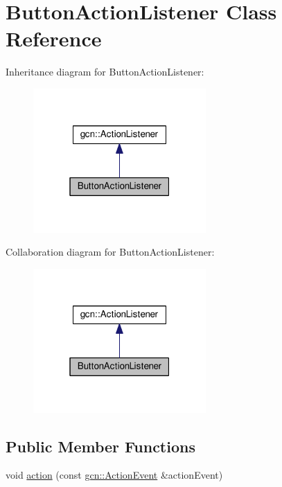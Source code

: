 \hypertarget{classButtonActionListener}{}\section{Button\+Action\+Listener Class Reference}
\label{classButtonActionListener}


Inheritance diagram for Button\+Action\+Listener\+:\nopagebreak
\begin{figure}[H]
\begin{center}
\leavevmode
\includegraphics[width=187pt]{classButtonActionListener__inherit__graph}
\end{center}
\end{figure}


Collaboration diagram for Button\+Action\+Listener\+:\nopagebreak
\begin{figure}[H]
\begin{center}
\leavevmode
\includegraphics[width=187pt]{classButtonActionListener__coll__graph}
\end{center}
\end{figure}
\subsection*{Public Member Functions}
\begin{DoxyCompactItemize}
\item 
void \hyperlink{classButtonActionListener_af6e587e3bdc21b68493b303af2753483}{action} (const \hyperlink{classgcn_1_1ActionEvent}{gcn\+::\+Action\+Event} \&action\+Event)
\end{DoxyCompactItemize}


